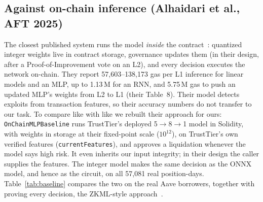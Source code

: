 \documentclass[sigconf,nonacm]{acmart}
\newcommand{\code}[1]{\texttt{\smaller #1}}
\begin{document}
\subsection{Against on-chain inference (Alhaidari et al., AFT 2025)}
\label{sec:eval-baseline}

The closest published system runs the model \emph{inside} the contract~\cite{alhaidari2025onchain}: quantized integer weights live in contract storage, governance updates them (in their design, after a Proof-of-Improvement vote on an L2), and every decision executes the network on-chain. They report 57,603--138,173 gas per L1 inference for linear models and an MLP, up to 1.13\,M for an RNN, and 5.75\,M gas to push an updated MLP's weights from L2 to L1 (their Table~8). Their model detects exploits from transaction features, so their accuracy numbers do not transfer to our task. To compare like with like we rebuilt their approach for ours: \code{OnChainMLPBaseline} runs TrustTier's deployed 5$\to$8$\to$1 model in Solidity, with weights in storage at their fixed-point scale ($10^{12}$), on TrustTier's own verified features (\code{currentFeatures}), and approves a liquidation whenever the model says high risk. It even inherits our input integrity; in their design the caller supplies the features. The integer model makes the same decision as the ONNX model, and hence as the circuit, on all 57,081 real position-days. Table~\ref{tab:baseline} compares the two on the real Aave borrowers, together with proving every decision, the ZKML-style approach~\cite{chen2024zkml}.
\end{document}
